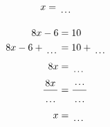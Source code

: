 \documentclass[12pt]{article}
\newcounter{minipagecount}
\begin{document}
\begin{multicols}{2}
\begin{minipage}[t]{0.45\textwidth}
\begin{align*}
        x &= \dotuline{\hspace{5mm}}\\
    \end{align*}
\end{minipage} %
\noindent{(\theminipagecount)}\hspace{0.1mm} %
\begin{minipage}[t]{0.45\textwidth} %
    \vspace{-26pt}  %
    \raggedright %
    \begin{align*} %
        8x - 6 &= 10\\
        8x - 6 + \dotuline{\hspace{5mm}} &= 10 + \dotuline{\hspace{5mm}}\\
        8x &= \dotuline{\hspace{5mm}}\\
        \frac{8x}{\dotuline{\hspace{5mm}}} &= \frac{\dotuline{\hspace{5mm}}}{\dotuline{\hspace{5mm}}}\\
        x &= \dotuline{\hspace{5mm}}\\
    \end{align*}
\end{minipage} %
\noindent{(\theminipagecount)}\hspace{0.1mm} %
\begin{minipage}[t]{0.45\textwidth} %
    \vspace{-26pt}  %

\end{minipage}
\end{multicols}
\end{document}
